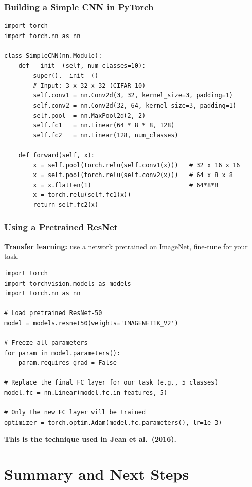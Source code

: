 \documentclass[notes,11pt, aspectratio=169]{beamer}
\begin{document}
\begin{frame}[fragile]
\frametitle{Building a Simple CNN in PyTorch}

\begin{lstlisting}
import torch
import torch.nn as nn

class SimpleCNN(nn.Module):
    def __init__(self, num_classes=10):
        super().__init__()
        # Input: 3 x 32 x 32 (CIFAR-10)
        self.conv1 = nn.Conv2d(3, 32, kernel_size=3, padding=1)
        self.conv2 = nn.Conv2d(32, 64, kernel_size=3, padding=1)
        self.pool  = nn.MaxPool2d(2, 2)
        self.fc1   = nn.Linear(64 * 8 * 8, 128)
        self.fc2   = nn.Linear(128, num_classes)

    def forward(self, x):
        x = self.pool(torch.relu(self.conv1(x)))   # 32 x 16 x 16
        x = self.pool(torch.relu(self.conv2(x)))   # 64 x 8 x 8
        x = x.flatten(1)                           # 64*8*8
        x = torch.relu(self.fc1(x))
        return self.fc2(x)
\end{lstlisting}
\end{frame}

\begin{frame}[fragile]
\frametitle{Using a Pretrained ResNet}

\textbf{Transfer learning:} use a network pretrained on ImageNet, fine-tune for your task.

\vspace{4pt}
\begin{lstlisting}
import torch
import torchvision.models as models
import torch.nn as nn

# Load pretrained ResNet-50
model = models.resnet50(weights='IMAGENET1K_V2')

# Freeze all parameters
for param in model.parameters():
    param.requires_grad = False

# Replace the final FC layer for our task (e.g., 5 classes)
model.fc = nn.Linear(model.fc.in_features, 5)

# Only the new FC layer will be trained
optimizer = torch.optim.Adam(model.fc.parameters(), lr=1e-3)
\end{lstlisting}

\vspace{4pt}
\textbf{This is the technique used in Jean et al.\ (2016).}
\end{frame}


\section{Summary and Next Steps}
\end{document}
